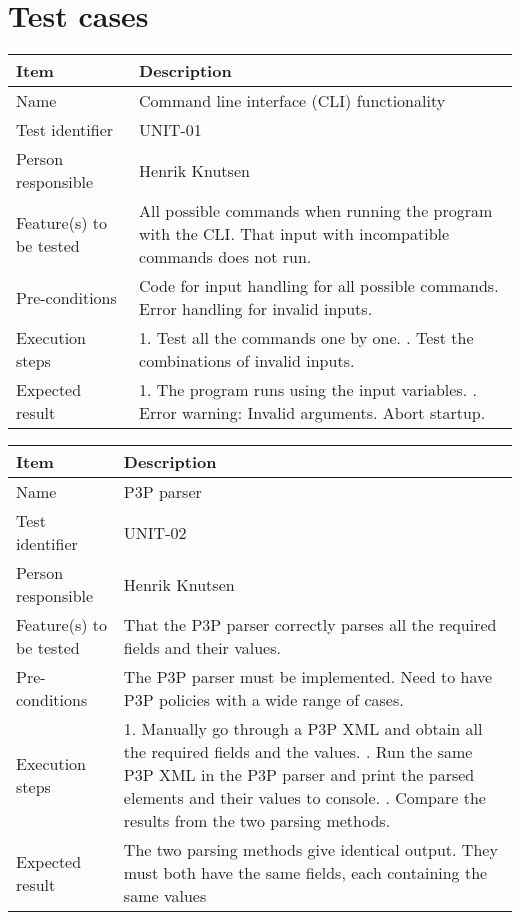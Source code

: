 \documentclass[12pt, fullpage, oneside]{report}
\begin{document}
	\newpage
	\section{Test cases}
		\vspace{8 mm}		

		\begin{center}
			\begin{tabular}{ |  p{3.5cm} | p{10cm} | }
				\hline
				Item & Description \\ [5pt] \hline \hline
				Name & Command line interface (CLI) functionality \\  [5pt] \hline
				Test identifier & UNIT-01 \\  [5pt] \hline
				Person responsible & Henrik Knutsen \\  [5pt] \hline
				Feature(s) to be tested & All possible commands when running the program with the CLI. That input with incompatible commands does not run. \\  [5pt] \hline
				Pre-conditions & Code for input handling for all possible commands. Error handling for invalid inputs. \\  [5pt] \hline
				Execution steps & 1. Test all the commands one by one. \newline 2. Test the combinations of invalid inputs. \\  [5pt] \hline
				Expected result & 1. The program runs using the input variables. \newline 2. Error warning: Invalid arguments. Abort startup. \\  [5pt] \hline
			\end{tabular}
		\end{center}

		\begin{center}
			\begin{tabular}{ |  p{3.5cm} | p{10cm} | }
				\hline
				Item & Description \\ [5pt] \hline \hline
				Name & P3P parser \\  [5pt] \hline
				Test identifier & UNIT-02 \\  [5pt] \hline
				Person responsible & Henrik Knutsen \\  [5pt] \hline
				Feature(s) to be tested & That the P3P parser correctly parses all the required fields and their values. \\  [5pt] \hline
				Pre-conditions & The P3P parser must be implemented. Need to have P3P policies with a wide range of cases. \\  [5pt] \hline
				Execution steps & 1. Manually go through a P3P XML and obtain all the required fields and the values. \newline 2. Run the same P3P XML in the P3P parser and print the parsed elements and their values to console.
					\newline 3. Compare the results from the two parsing methods. \\  [5pt] \hline
				Expected result & The two parsing methods give identical output. They must both have the same fields, each containing the same values \\  [5pt] \hline
			\end{tabular}
		\end{center}
		
\end{document}
